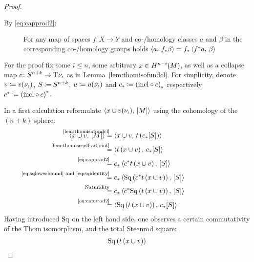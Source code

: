 \begin{Thm}
\begin{proof}
\begin{description}
    \item[By \eqref{eq:capprod2}:]
      For any map of spaces $f\colon X\to Y$ and co-/homology classes
      $a$ and $\beta$ in the corresponding co-/homology groups holds
      $\left\langle a,\, {f}_* \beta \right\rangle = {f}_* \left\langle {f}^* a,\, \beta \right\rangle$
    \end{description}
    For the proof fix some $i\leq n$, some arbitrary $x\in
    H^{n-i}(M)$, as well as a collapse map
    $c\colon S^{n+k}\to\mathrm{T}{\nu_{{\iota}}}$ as in
    Lemma~\ref{lem:thomisofundcl}.
    For simplicity, denote
    $v\coloneqq {v}(\nu_{{\iota}})$,
    $S\coloneqq S^{n+k}$,
    $u\coloneqq {u}(\nu_{{\iota}})$ and
    ${c}_*\coloneqq {(\mathrm{incl}\circ c)}_*$
    respectively
    ${c}^*\coloneqq {(\mathrm{incl}\circ c)}^*$.
    
    
    In a first calculation reformulate
    $\left\langle x\cup {v}(\nu_{{\iota}}),\, [M] \right\rangle$ using the cohomology of the
    $(n+k)$-sphere:
    \begin{align}\notag
      \capped{x\cup \Vu}{\fundcl M}
      &\equalsby{\ref{lem:thomisofundcl}}
        \capped
        {x\cup\Vu}
        {\thomiso\left(\pf\collapse\fundcl{\Sph}\right)}
      \\\notag
      &\equalsby{\ref{lem:thomisoself-adjoint}}
        \capped
        {\thomiso\left(x\cup\Vu\right)}
        {\pf\collapse\fundcl{\Sph}}
      \\\notag
      &\equalsby{\eqref{eq:capprod2}}
        \pf\collapse\capped
        {\pb\collapse\thomiso\left(x\cup\Vu\right)}
        {\fundcl{\Sph}}
      \\\notag
      &\equalsby{\eqref{eq:sqlowerbound} and \eqref{eq:sqidentity}}
        \pf\collapse\capped
        {\SQ\left(\pb\collapse\thomiso\left(x\cup\Vu\right)\right)}
        {\fundcl{\Sph}}
      \\\notag
      &\equalsby{Naturality}
        \pf\collapse\capped
        {\pb\collapse\SQ\left(\thomiso\left(x\cup\Vu\right)\right)}
        {\fundcl{\Sph}}
      \\\label{eq:proofaltdefwuclasses:eq1}
      &\equalsby{\eqref{eq:capprod2}}
        \capped
        {\SQ\left(\thomiso\left(x\cup\Vu\right)\right)}
        {\pf\collapse\fundcl{\Sph}}
    \end{align}
    Having introduced $\mathrm{Sq}$ on the left hand side, one observes a
    certain commutativity of the Thom isomorphism, and the total
    Steenrod square:
    \begin{align}\notag
      \SQ\left(\thomiso\left(x\cup\Vu\right)\right)

\end{align}
\end{proof}
\end{Thm}
